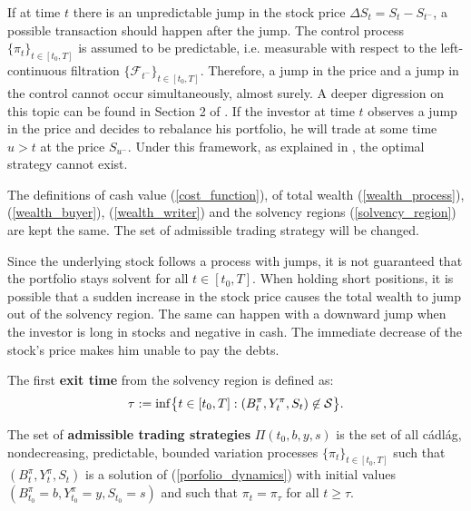 If at time $t$ there is an unpredictable jump in the stock price $\Delta S_t = S_t - S_{t^-}$, a possible transaction should happen after the jump.
The control process $\{\pi_t\}_{t \in [t_0,T]}$ is assumed to be predictable, i.e. measurable with respect to the left-continuous filtration $\{\mathcal{F}_{t^-}\}_{t \in [t_0,T]}$.
Therefore, a jump in the price and a jump in the control cannot occur simultaneously, almost surely. 
A deeper digression on this topic can be found in Section 2 of \cite{Kab16}.   
If the investor at time $t$ observes a jump in the price and decides to rebalance his portfolio, he will trade at some time $u>t$ at the price $S_{u^-}$. 
Under this framework, as explained in \cite{Kab16}, the optimal strategy cannot exist. 

The definitions of cash value (\ref{cost_function}), of total wealth (\ref{wealth_process}), (\ref{wealth_buyer}), (\ref{wealth_writer}) and the solvency regions
(\ref{solvency_region}) are kept the same. The set of admissible trading strategy will be changed.

Since the underlying stock follows a process with jumps, it is not guaranteed that the portfolio stays
solvent for all $t \in [t_0,T]$. When holding short positions, it is possible that a sudden increase in the stock price 
causes the total wealth to jump out of the solvency region. 
The same can happen with a downward jump when the investor is long in stocks and negative in cash. 
The immediate decrease of the stock's price makes him unable to pay the debts.
\begin{Definition}
The first \textbf{exit time} from the solvency region is defined as:
\begin{equation}\label{exit_time}
 \tau := \inf \bigl\{ t \in [t_0,T] : (B^\pi_t,Y^\pi_t,S_t) \not\in \mathcal{S} \bigr\}.
\end{equation} 
\end{Definition}
\begin{Definition}\label{set_trad_strat}
The set of \textbf{admissible trading strategies} $\Pi(t_0,b,y,s)$   
is the set of all cádlág, nondecreasing, predictable, bounded variation processes $\{\pi_t\}_{t \in [t_0,T]}$
such that $(B^\pi_t,Y^\pi_t,S_t)$ is a solution of (\ref{porfolio_dynamics}) with initial values $(B^\pi_{t_0} = b, Y^\pi_{t_0} = y, S_{t_0} = s)$ and such that
$\pi_t = \pi_{\tau}$ for all $t \geq \tau$.  
\end{Definition}

